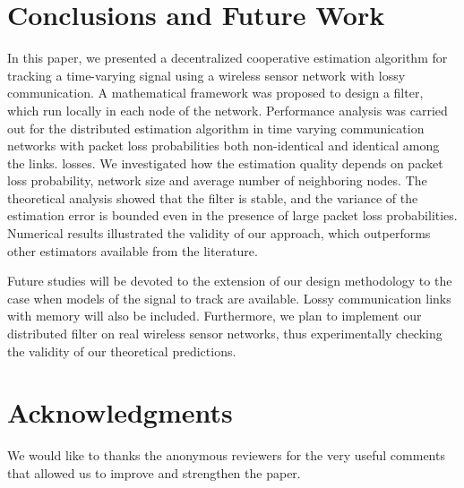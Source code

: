 \documentclass[a4paper,notitlepage,onecolumn]{article}
\numberwithin{equation}{section}
\begin{document}
\section{Conclusions and Future Work}
\label{sec:conclusions} In this paper, we presented a
decentralized cooperative estimation algorithm for tracking a
time-varying signal using a wireless sensor network with lossy
communication. A mathematical framework was proposed to design a
filter, which run locally in each node of the network. Performance
analysis was carried out for the distributed estimation algorithm
in time varying communication networks with packet loss
probabilities both non-identical and identical among the links.
losses. We investigated how the estimation quality depends on
packet loss probability, network size and average number of
neighboring nodes. The theoretical analysis showed that the filter
is stable, and the variance of the estimation error is bounded
even in the presence of large packet loss probabilities. Numerical
results illustrated the validity of our approach, which
outperforms other estimators available from the literature.

Future studies will be devoted to the extension of our design methodology to the case when models of the signal to track are available. Lossy communication links with memory will also be included. Furthermore, we plan to implement our distributed filter on real wireless sensor networks, thus experimentally checking the validity of our theoretical predictions.

\section{Acknowledgments}
We would like to thanks the anonymous reviewers for the very useful comments that allowed us to improve and strengthen the paper.




\end{document}
